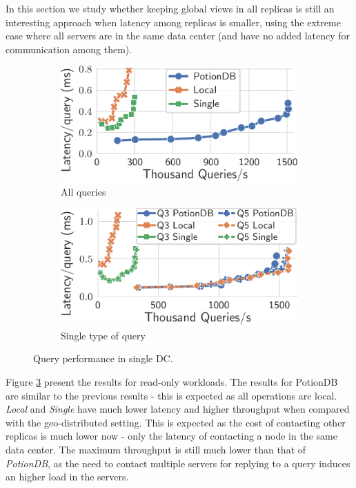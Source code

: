 \documentclass[sigplan,twocolumn,review,anonymous]{acmart}
\begin{document}
In this section we study whether keeping global views in all replicas is still an interesting approach when
latency among replicas is smaller, using the extreme case where all servers are in the same data center
(and have no added latency for communication among them).


\begin{figure}
	\centering
	\begin{subfigure}{.49\linewidth}
		\includegraphics[width=1\linewidth]{singleQuery/all_queries_noTC}
		\caption{All queries}
		\label{fig:all_queries_noTC}
	\end{subfigure}%
	\hspace*{0.2em}
	\begin{subfigure}{.49\linewidth}
		\includegraphics[width=1\linewidth]{singleQuery/q3_q5_noLatency}
		\caption{Single type of query}
		\label{fig:q3_q5_noTC}
	\end{subfigure}%
	\vspace*{-0.65em}
	\caption{Query performance in single DC.}
	\label{fig:global_local_single_noTC}
	\vspace*{-1.2em}
\end{figure}


Figure \ref{fig:global_local_single_noTC} present the results for read-only workloads.
The results for PotionDB are similar to the previous results - this is expected as all operations are local.
\textit{Local} and \emph{Single} have much lower latency and higher throughput when compared with the
geo-distributed setting.  This is expected as the cost of contacting other replicas is much lower now - only the
latency of contacting a node in the same data center.  The maximum throughput is still much lower than that
of \textit{PotionDB}, as the need to contact multiple servers for replying to a query induces 
an higher load in the servers. 
\end{document}
